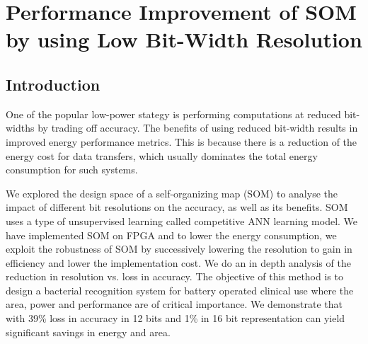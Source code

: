 \documentclass[a4paper,10pt]{article}
\begin{document}
\section{Performance Improvement of SOM by using Low Bit-Width Resolution}
\subsection{Introduction}
One of the popular low-power stategy is performing computations at reduced bit-widths by trading off accuracy. The benefits of using reduced bit-width results in improved energy performance metrics. This is because there is a reduction of the energy cost for data transfers, which usually dominates the total energy consumption for such systems.

We explored the design space of a self-organizing map (SOM) to analyse the impact of different bit resolutions on the accuracy, as well as its benefits. SOM uses a type of unsupervised learning called competitive ANN learning model. We have implemented SOM on FPGA and to lower the energy consumption, we exploit the robustness of SOM by successively lowering the resolution to gain in efficiency and lower the implementation cost. We do an in depth analysis of the reduction in resolution vs. loss in accuracy. The objective of this method is to design a bacterial recognition system for battery operated clinical use where the area, power and performance are of critical importance. We demonstrate that with 39\% loss in accuracy in 12 bits and 1\% in 16 bit representation can yield significant savings in energy and area.

\end{document}
